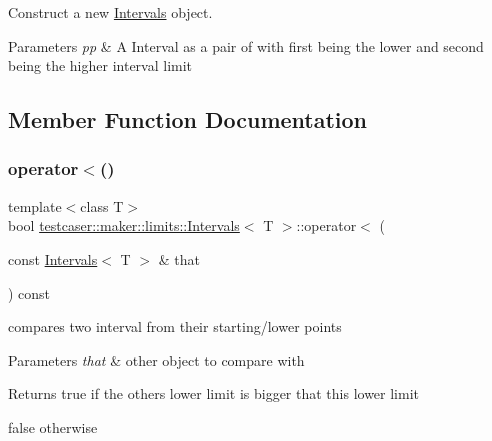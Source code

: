 Construct a new \mbox{\hyperlink{structtestcaser_1_1maker_1_1limits_1_1Intervals}{Intervals}} object. 


\begin{DoxyParams}{Parameters}
{\em pp} & A Interval as a pair of with first being the lower and second being the higher interval limit \\
\hline
\end{DoxyParams}


\subsection{Member Function Documentation}
\mbox{\label{structtestcaser_1_1maker_1_1limits_1_1Intervals_a68c68c86d5074b2853d0f8582381fc7a}} 
\subsubsection{\texorpdfstring{operator$<$()}{operator<()}}
{\footnotesize\ttfamily template$<$class T$>$ \\
bool \mbox{\hyperlink{structtestcaser_1_1maker_1_1limits_1_1Intervals}{testcaser\+::maker\+::limits\+::\+Intervals}}$<$ T $>$\+::operator$<$ (\begin{DoxyParamCaption}\item[{const \mbox{\hyperlink{structtestcaser_1_1maker_1_1limits_1_1Intervals}{Intervals}}$<$ T $>$ \&}]{that }\end{DoxyParamCaption}) const\hspace{0.3cm}{\ttfamily [inline]}}



compares two interval from their starting/lower points 


\begin{DoxyParams}{Parameters}
{\em that} & other object to compare with \\
\hline
\end{DoxyParams}
\begin{DoxyReturn}{Returns}
true if the other\textquotesingle{}s lower limit is bigger that this lower limit 

false otherwise 
\end{DoxyReturn}
\mbox{\label{structtestcaser_1_1maker_1_1limits_1_1Intervals_af5204b4a6f57b16d6719a16554321b4b}} 
